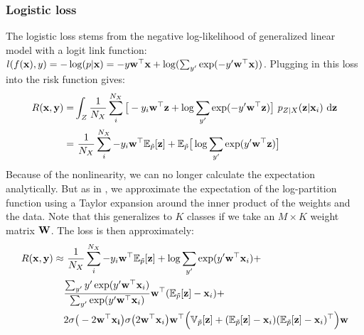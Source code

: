 \documentclass[twoside,11pt]{article}
\begin{document}
\subsubsection{Logistic loss}
The logistic loss stems from the negative log-likelihood of generalized linear model with a logit link function: $l(f({\bf x}),y)= -\log(p|{\bf x}) = -y{\bf w}^{\top}{\bf x} + \log(\sum_{y'} \exp(-y'{\bf w}^{\top}{\bf x}))$. Plugging in this loss into the risk function gives:
\begin{align}
	R({\bf x},{\bf y}) =& \int_{Z} \frac{1}{N_{X}} \sum^{N_{X}}_{i} \big[-y_{i}{\bf w}^{\top}{\bf z} + \log\sum_{y'} \exp(-y'{\bf w}^{\top}{\bf z}) \big] \ p_{Z|X}({\bf z}|{\bf x}_{i}) \ \mathrm{d}{\bf z} \nonumber \\
	=& \ \frac{1}{N_{X}} \sum_{i}^{N_{X}} - y_{i}{\bf w}^{\top}\mathbb{E}_{\tilde{p}}[{\bf z}] + \mathbb{E}_{\tilde{p}}\big[\log \sum_{y'} \exp( y'{\bf w}^{\top}{\bf z})\big] 
\end{align}
Because of the nonlinearity, we can no longer calculate the expectation analytically. But as in \cite{wager2013dropout}, we approximate the expectation of the log-partition function using a Taylor expansion around the inner product of the weights and the data. Note that this generalizes to $K$ classes if we take an $M \times K$ weight matrix ${\bf W}$. The loss is then approximately:
\begin{align}
R({\bf x},{\bf y}) \approx& \ \frac{1}{N_{X}} \sum_{i}^{N_{X}} - y_{i}{\bf w}^{\top}\mathbb{E}_{\tilde{p}}[{\bf z}] + \log \sum_{y'} \exp( y'{\bf w}^{\top}{\bf x}_{i}) + \nonumber \\
& \frac{\sum_{y'} y'\exp(y'{\bf w}^{\top}{\bf x}_{i})}{\sum_{y'}\exp(y'{\bf w}^{\top}{\bf x}_{i})}{\bf w}^{\top}(\mathbb{E}_{\tilde{p}}[{\bf z}]-{\bf x}_{i}) + \nonumber \\
& 2\sigma \big(-2{\bf w^{\top}x_{i}}\big)\sigma \big(2{\bf w^{\top}x}_{i}\big){\bf w}^{\top}\Big(\mathbb{V}_{\tilde{p}}[{\bf z}] + (\mathbb{E}_{\tilde{p}}[{\bf z}]-{\bf x}_{i})(\mathbb{E}_{\tilde{p}}[{\bf z}]-{\bf x}_{i})^{\top} \Big){\bf w} \label{log_loss}
\end{align}
\end{document}

